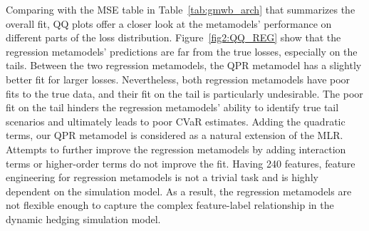 Comparing with the MSE table in Table~\ref{tab:gmwb_arch} that summarizes the overall fit, QQ plots offer a closer look at the metamodels' performance on different parts of the loss distribution.
Figure~\ref{fig2:QQ_REG} show that the regression metamodels' predictions are far from the true losses, especially on the tails.
Between the two regression metamodels, the QPR metamodel has a slightly better fit for larger losses.
Nevertheless, both regression metamodels have poor fits to the true data, and their fit on the tail is particularly undesirable.
The poor fit on the tail hinders the regression metamodels' ability to identify true tail scenarios and ultimately leads to poor CVaR estimates.
Adding the quadratic terms, our QPR metamodel is considered as a natural extension of the MLR.
Attempts to further improve the regression metamodels by adding interaction terms or higher-order terms do not improve the fit.
Having 240 features, feature engineering for regression metamodels is not a trivial task and is highly dependent on the simulation model. 
As a result, the regression metamodels are not flexible enough to capture the complex feature-label relationship in the dynamic hedging simulation model.

